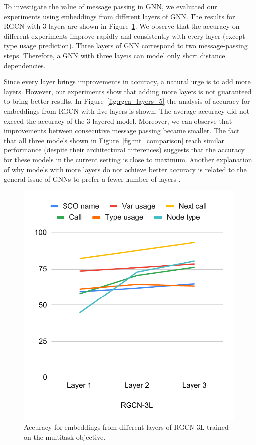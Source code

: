 \documentclass[a4paper,twoside]{article}
\begin{document}
To investigate the value of message passing in GNN, we evaluated our experiments using embeddings from different layers of GNN\@. The results for RGCN with 3 layers are shown in Figure~\ref{fig:rgcn_layers_3}. We observe that the accuracy on different experiments improve rapidly and consistently with every layer (except type usage prediction). Three layers of GNN correspond to two message-passing steps. Therefore, a GNN with three layers can model only short distance dependencies.

Since every layer brings improvements in accuracy, a natural urge is to add more layers. However, our experiments show that adding more layers is not guaranteed to bring better results. In Figure~\ref{fig:rgcn_layers_5} the analysis of accuracy for embeddings from RGCN with five layers is shown. The average accuracy did not exceed the accuracy of the 3-layered model. Moreover, we can observe that improvements between consecutive message passing became smaller. The fact that all three models shown in Figure~\ref{fig:mt_comparison} reach similar performance (despite their architectural differences) suggests that the accuracy for these models in the current setting is close to maximum. Another explanation of why models with more layers do not achieve better accuracy is related to the general issue of GNNs to prefer a fewer number of layers \cite{zhou2018graph}.

\begin{figure}[]
    \centering
    \includegraphics[width=\columnwidth]{rgcn-3l.pdf}
    \caption{Accuracy for embeddings from different layers of RGCN-3L trained on the multitask objective.}\label{fig:rgcn_layers_3}
\end{figure}
\end{document}
